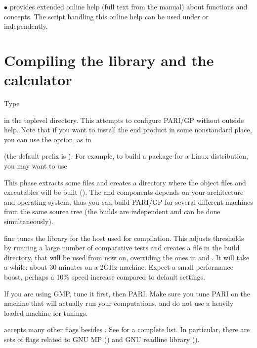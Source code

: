   $\bullet$  provides extended online help (full text from the
manual) about functions and concepts. The script handling this online help
can be used under  or independently.

\section{Compiling the library and the  calculator}

 Type


\noindent in the toplevel directory. This attempts to configure PARI/GP
without outside help. Note that if you want to install the end product in
some nonstandard place, you can use the  option, as in


\noindent (the default prefix is ). For example, to build a
package for a Linux distribution, you may want to use


This phase extracts some files and creates a directory
\kbd{-} where the
object files and executables will be built (). The
 and  components depends on your architecture and
operating system, thus you can build PARI/GP for several different machines
from the same source tree (the builds are independent and can be done
simultaneously).


\noindent fine tunes the library for the host used for compilation. This
adjusts thresholds by running a large number of comparative tests
and creates a file  in the build directory, that will be
used from now on, overriding the ones in  and
. It will take a while: about 30 minutes on a 2GHz
machine. Expect a small performance boost, perhaps a 10\% speed increase
compared to default settings.

If you are using GMP, tune it first, then PARI. Make sure you tune PARI on
the machine that will actually run your computations, and do not use a
heavily loaded machine for tunings.

  accepts many other flags
besides . See  for a complete list. In
particular, there are sets of flags related to GNU MP () and
GNU readline library ().

